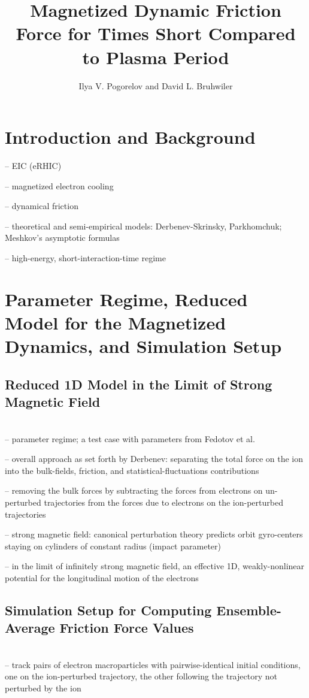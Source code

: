 \documentclass[12pt, reqno]{amsart}
\title{Magnetized Dynamic Friction Force for Times Short Compared to Plasma Period}
\author{Ilya V. Pogorelov and David L. Bruhwiler}
\date{} %
\begin{document}
\maketitle
\tableofcontents

\section{Introduction and Background}


-- EIC (eRHIC) 

-- magnetized electron cooling 

-- dynamical friction 

-- theoretical and semi-empirical models: Derbenev-Skrinsky, Parkhomchuk;  Meshkov's asymptotic formulas 

-- high-energy, short-interaction-time regime 

\section{Parameter Regime, Reduced Model for the Magnetized Dynamics, and Simulation Setup}

\subsection{Reduced 1D Model in the Limit of Strong Magnetic Field } 
~\\
-- parameter regime; a test case with parameters from Fedotov et al. 

-- overall approach as set forth by Derbenev: separating the total force on the ion into the bulk-fields, friction, and statistical-fluctuations contributions 

-- removing the bulk forces by subtracting the forces from electrons on un-perturbed trajectories from the forces due to electrons on the ion-perturbed trajectories 

-- strong magnetic field: canonical perturbation theory predicts orbit gyro-centers staying on cylinders of constant radius (impact parameter) 

-- in the limit of infinitely strong magnetic field, an effective 1D, weakly-nonlinear potential for the longitudinal motion of the electrons 

\subsection{Simulation Setup for Computing Ensemble-Average Friction Force Values} 
~\\
-- track pairs of electron macroparticles with pairwise-identical initial conditions, one on the ion-perturbed trajectory, the other following the trajectory not  perturbed by the ion 
\end{document}
